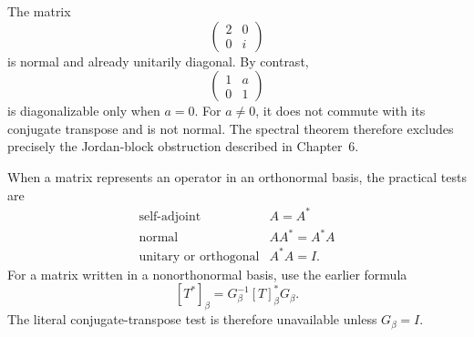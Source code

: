 \begin{example}
The matrix
\[
\begin{pmatrix}2&0\\0&i\end{pmatrix}
\]
is normal and already unitarily diagonal. By contrast,
\[
\begin{pmatrix}1&a\\0&1\end{pmatrix}
\]
is diagonalizable only when \(a=0\). For \(a\ne0\), it does not commute
with its conjugate transpose and is not normal. The spectral theorem
therefore excludes precisely the Jordan-block obstruction described in
Chapter~6.
\end{example}

\begin{remark}
When a matrix represents an operator in an orthonormal basis, the practical
tests are
\[
\begin{array}{c|c}
\text{self-adjoint}&A=A^*\\
\text{normal}&AA^*=A^*A\\
\text{unitary or orthogonal}&A^*A=I.
\end{array}
\]
For a matrix written in a nonorthonormal basis, use the earlier formula
\[
[T^*]_\beta=G_\beta^{-1}[T]_\beta^*G_\beta.
\]
The literal conjugate-transpose test is therefore unavailable unless
\(G_\beta=I\).
\end{remark}

